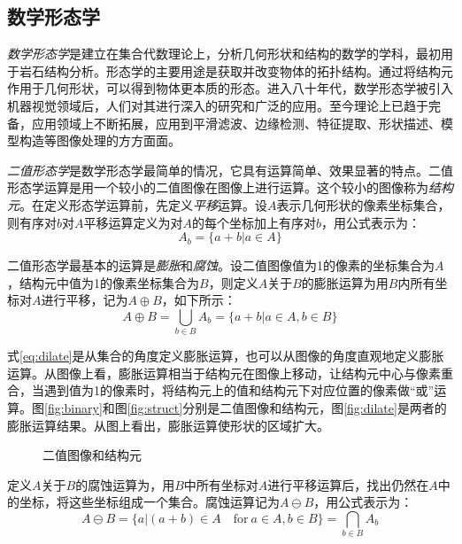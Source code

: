 \subsection{数学形态学}

\emph{数学形态学}是建立在集合代数理论上，分析几何形状和结构的数学的学科，最初用于岩石结构分析。形态学的主要用途是获取并改变物体的拓扑结构。通过将结构元作用于几何形状，可以得到物体更本质的形态。进入八十年代，数学形态学被引入机器视觉领域后，人们对其进行深入的研究和广泛的应用。至今理论上已趋于完备，应用领域上不断拓展，应用到平滑滤波、边缘检测、特征提取、形状描述、模型构造等图像处理的方方面面。

\emph{二值形态学}是数学形态学最简单的情况，它具有运算简单、效果显著的特点。二值形态学运算是用一个较小的二值图像在图像上进行运算。这个较小的图像称为\emph{结构元}。在定义形态学运算前，先定义\emph{平移}运算。设$A$表示几何形状的像素坐标集合，则有序对$b$对$A$平移运算定义为对$A$的每个坐标加上有序对$b$，用公式表示为：
\begin{equation}
  \label{eq:shift}
  A_b=\{a+b|a\in A\}
\end{equation}

二值形态学最基本的运算是\emph{膨胀}和\emph{腐蚀}。设二值图像值为1的像素的坐标集合为$A$，结构元中值为1的像素坐标集合为$B$，则定义$A$关于$B$的膨胀运算为用$B$内所有坐标对$A$进行平移，记为$A\oplus B$，如下所示：
\begin{equation}
  \label{eq:dilate}
  A\oplus B=\bigcup_{b\in B}A_b=\{a+b|a\in A,b\in B\}
\end{equation}

式\eqref{eq:dilate}是从集合的角度定义膨胀运算，也可以从图像的角度直观地定义膨胀运算。从图像上看，膨胀运算相当于结构元在图像上移动，让结构元中心与像素重合，当遇到值为1的像素时，将结构元上的值和结构元下对应位置的像素做“或”运算。图\ref{fig:binary}和图\ref{fig:struct}分别是二值图像和结构元，图\ref{fig:dilate}是两者的膨胀运算结果。从图上看出，膨胀运算使形状的区域扩大。
\begin{figure}
  \centering
  \hspace{1cm}
  \caption{二值图像和结构元}
\end{figure}

定义$A$关于$B$的腐蚀运算为，用$B$中所有坐标对$A$进行平移运算后，找出仍然在$A$中的坐标，将这些坐标组成一个集合。腐蚀运算记为$A\ominus B$，用公式表示为：
\begin{equation}
  \label{eq:erode}
  A\ominus B=\{a|(a+b)\in A\quad\textrm{for}\ a\in A,b\in B\}=\bigcap_{b\in B}A_b
\end{equation}

